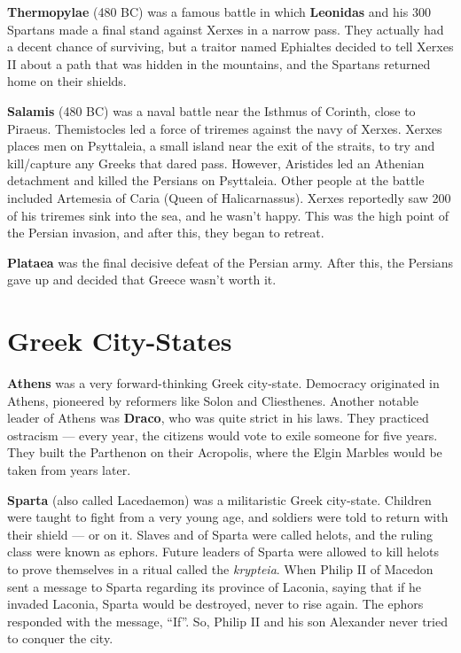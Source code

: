 \textbf{Thermopylae} (480 BC) was a famous battle in which \textbf{Leonidas} and his 300 Spartans
made a final stand against Xerxes in a narrow pass.
They actually had a decent chance of surviving,
but a traitor named Ephialtes decided to tell Xerxes II about a path that
was hidden in the mountains, and the Spartans returned home on their shields.

\textbf{Salamis} (480 BC) was a naval battle near the Isthmus of Corinth, close to Piraeus.
Themistocles led a force of triremes against the navy of Xerxes.
Xerxes places men on Psyttaleia, a small island near the exit of the straits,
to try and kill/capture any Greeks that dared pass.
However, Aristides led an Athenian detachment and killed the Persians on Psyttaleia.
Other people at the battle included Artemesia of Caria (Queen of Halicarnassus).
Xerxes reportedly saw 200 of his triremes sink into the sea, and he wasn't happy.
This was the high point of the Persian invasion, and after this, they began to retreat.

\textbf{Plataea} was the final decisive defeat of the Persian army.
After this, the Persians gave up and decided that Greece wasn't worth it.

\section{Greek City-States}

\textbf{Athens} was a very forward-thinking Greek city-state.
Democracy originated in Athens, pioneered by reformers like Solon and Cliesthenes.
Another notable leader of Athens was \textbf{Draco}, who was quite strict in his laws.
They practiced ostracism --- every year, the citizens would vote to exile someone for five years.
They built the Parthenon on their Acropolis, where the Elgin Marbles would be taken from years later.

\textbf{Sparta} (also called Lacedaemon) was a militaristic Greek city-state.
Children were taught to fight from a very young age, and soldiers were told to return with their shield --- or on it.
Slaves and of Sparta were called helots, and the ruling class were known as ephors.
Future leaders of Sparta were allowed to kill helots to prove themselves in a ritual called the \textit{krypteia}.
When Philip II of Macedon sent a message to Sparta regarding its province of Laconia,
saying that if he invaded Laconia, Sparta would be destroyed, never to rise again.
The ephors responded with the message, ``If''.
So, Philip II and his son Alexander never tried to conquer the city.

